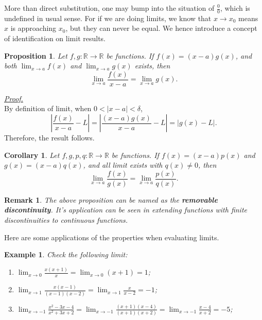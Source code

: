 \documentclass[12pt]{article}
\newtheorem*{corollary}{Corollary}
\newtheorem*{proposition}{Proposition}
\newtheorem*{remark}{Remark}
\newtheorem*{example}{Example}
\renewenvironment{proof}[1][Proof]{\begin{snugshade*} \underline{\textit{{#1}.}}\\}{\hfill \qedsymbol \end{snugshade*}}
\begin{document}
    More than direct substitution, one may bump into the situation of $\frac{0}{0}$, which is undefined in usual sense. For if we are doing limits, we know that $x\to x_0$ means $x$ is approaching $x_0$, but they can never be equal. We hence introduce a concept of identification on limit results.

    \begin{proposition}
        Let $f,g:\mathbb{R}\to\mathbb{R}$ be functions. If $f(x)=(x-a)g(x)$, and both $\lim_{x\to a} f(x)$ and $\lim_{x\to a}g(x)$ exists, then \[\lim_{x\to a}\frac{f(x)}{x-a}=\lim_{x\to a}g(x).\]
    \end{proposition}

    \begin{proof}
        By definition of limit, when $0<|x-a|<\delta$, \[|\frac{f(x)}{x-a}-L|=|\frac{(x-a)g(x)}{x-a}-L|=|g(x)-L|.\] Therefore, the result follows.
    \end{proof}

    \begin{corollary}
        Let $f,g,p,q:\mathbb{R}\to\mathbb{R}$ be functions. If $f(x)=(x-a)p(x)$ and $g(x)=(x-a)q(x)$, and all limit exists with $q(x)\neq 0$, then \[\lim_{x\to a}\frac{f(x)}{g(x)}=\lim_{x\to a}\frac{p(x)}{q(x)}.\]
    \end{corollary}

    \begin{remark}
        The above proposition can be named as the \textbf{removable discontinuity}. It's application can be seen in extending functions with finite discontinuities to continuous functions.
    \end{remark}

    Here are some applications of the properties when evaluating limits.

    \begin{example}
        Check the following limit:
        \begin{enumerate}
            \item $\displaystyle \lim_{x\to 0}\frac{x(x+1)}{x}=\lim_{x\to 0}(x+1)=1$;
            \item $\displaystyle \lim_{x\to 1}\frac{x(x-1)}{(x-1)(x-2)}=\lim_{x\to 1}\frac{x}{x-2}=-1$;
            \item $\displaystyle \lim_{x\to -1}\frac{x^2-3x-4}{x^2+3x+2}=\lim_{x\to -1}\frac{(x+1)(x-4)}{(x+1)(x+2)}=\lim_{x\to -1}\frac{x-4}{x+2}=-5$;
        \end{enumerate}
    \end{example}
\end{document}
